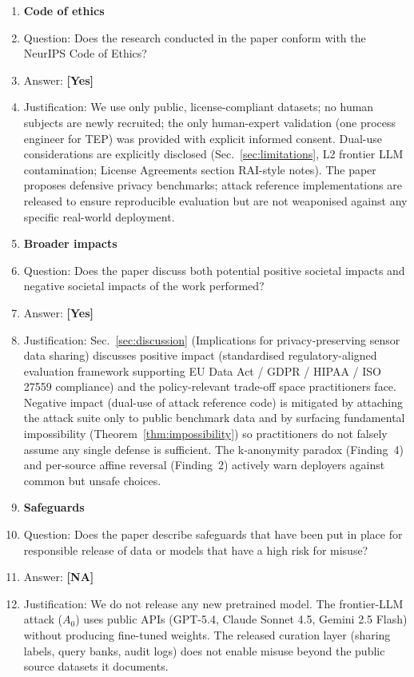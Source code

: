 \documentclass{article}
\theoremstyle{remark}
\begin{document}
\begin{enumerate}
\item {\bf Code of ethics}
\item[] Question: Does the research conducted in the paper conform with the NeurIPS Code of Ethics?
\item[] Answer: \textbf{[Yes]}
\item[] Justification: We use only public, license-compliant datasets; no human subjects are newly recruited; the only human-expert validation (one process engineer for TEP) was provided with explicit informed consent. Dual-use considerations are explicitly disclosed (Sec.~\ref{sec:limitations}, L2 frontier LLM contamination; License Agreements section RAI-style notes). The paper proposes defensive privacy benchmarks; attack reference implementations are released to ensure reproducible evaluation but are not weaponised against any specific real-world deployment.

\item {\bf Broader impacts}
\item[] Question: Does the paper discuss both potential positive societal impacts and negative societal impacts of the work performed?
\item[] Answer: \textbf{[Yes]}
\item[] Justification: Sec.~\ref{sec:discussion} (Implications for privacy-preserving sensor data sharing) discusses positive impact (standardised regulatory-aligned evaluation framework supporting EU Data Act / GDPR / HIPAA / ISO 27559 compliance) and the policy-relevant trade-off space practitioners face. Negative impact (dual-use of attack reference code) is mitigated by attaching the attack suite only to public benchmark data and by surfacing fundamental impossibility (Theorem~\ref{thm:impossibility}) so practitioners do not falsely assume any single defense is sufficient. The k-anonymity paradox (Finding~4) and per-source affine reversal (Finding~2) actively warn deployers against common but unsafe choices.

\item {\bf Safeguards}
\item[] Question: Does the paper describe safeguards that have been put in place for responsible release of data or models that have a high risk for misuse?
\item[] Answer: \textbf{[NA]}
\item[] Justification: We do not release any new pretrained model. The frontier-LLM attack ($A_0$) uses public APIs (GPT-5.4, Claude Sonnet 4.5, Gemini 2.5 Flash) without producing fine-tuned weights. The released curation layer (sharing labels, query banks, audit logs) does not enable misuse beyond the public source datasets it documents.


\end{enumerate}
\end{document}
